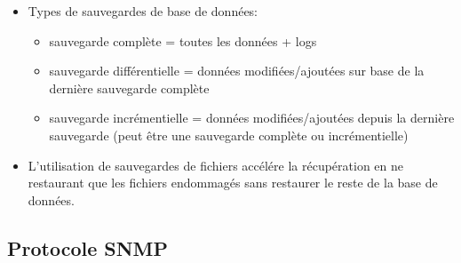 \documentclass[a4paper]{article}
\begin{document}
\begin{itemize}
\begin{center}
\end{center}



\item Types de sauvegardes de base de données:
\begin{itemize}
    \item sauvegarde complète = toutes les données + logs
    \item sauvegarde différentielle = données modifiées/ajoutées sur base de la dernière sauvegarde complète
    \item sauvegarde incrémentielle = données modifiées/ajoutées depuis la dernière sauvegarde (peut être une sauvegarde complète ou incrémentielle)
\end{itemize}



\item L’utilisation de sauvegardes de fichiers accélére la récupération en ne restaurant que les fichiers endommagés sans restaurer le reste de la base de données.



\end{itemize}










\subsection{Protocole SNMP}
\end{document}
